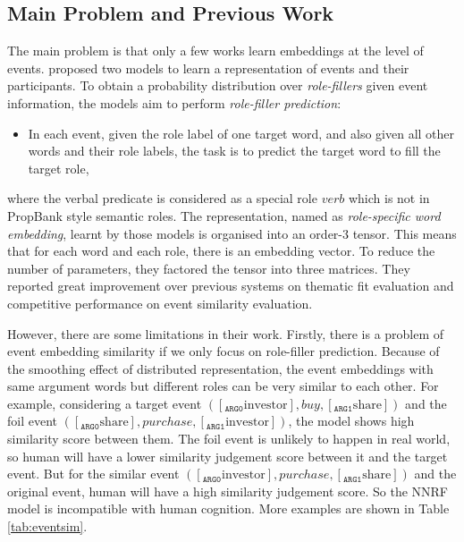 \documentclass[a4paper]{article}
\begin{document}
\subsection{Main Problem and Previous Work} \label{sec:previous}
The main problem is that only a few works learn embeddings at the level of events. \citet{tilk2016event} proposed two models to learn a representation of events and their participants. To obtain a probability distribution over \textit{role-fillers} given event information, the models aim to perform \textit{role-filler prediction}: 
\begin{itemize}
    \item  In each event, given the role label of one target word, and also given all other words and their role labels, the task is to predict the target word to fill the target role,
\end{itemize}
where the verbal predicate is considered as a special role $verb$ which is not in PropBank style semantic roles. The representation, named as \textit{role-specific word embedding}, learnt by those models is organised into an order-3 tensor. This means that for each word and each role, there is an embedding vector. To reduce the number of parameters, they factored the tensor into three matrices. They reported great improvement over previous systems on thematic fit evaluation and competitive performance on event similarity evaluation. 

However, there are some limitations in their work. Firstly, there is a problem of event embedding similarity if we only focus on role-filler prediction. Because of the smoothing effect of distributed representation, the event embeddings with same argument words but different roles can be very similar to each other. For example, considering a target event $([_{\texttt{ARG0}} \text{investor}], buy, [_{\texttt{ARG1}}\text{share}])$ and the foil event $([_{\texttt{ARG0}}\text{share}], purchase, [_{\texttt{ARG1}}\text{investor}])$, the model shows high similarity score between them. The foil event is unlikely to happen in real world, so human will have a lower similarity judgement score between it and the target event. But for the similar event $([_{\texttt{ARG0}}\text{investor}], purchase, [_{\texttt{ARG1}}\text{share}])$ and the original event, human will have a high similarity judgement score. So the NNRF model is incompatible with human cognition. More examples are shown in Table \ref{tab:eventsim}. 
% 
% 
% 
%
% 
%
\end{document}
